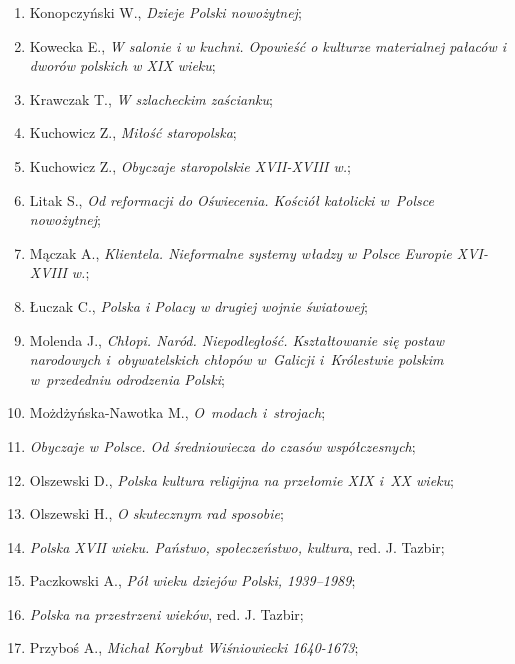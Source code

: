 \documentclass[a4paper,11pt]{article}
\begin{document}
\begin{enumerate}
\item Konopczyński W., \emph{Dzieje Polski nowożytnej};

\item Kowecka E., \emph{W salonie i w kuchni. Opowieść o kulturze
    materialnej pałaców i dworów polskich w XIX wieku};

\item Krawczak T., \emph{W szlacheckim zaścianku};

\item Kuchowicz Z., \emph{Miłość staropolska};

\item Kuchowicz Z., \emph{Obyczaje staropolskie XVII-XVIII w.};

\item Litak S., \emph{Od reformacji do Oświecenia. Kościół katolicki
    w~Polsce nowożytnej};

\item Mączak A., \emph{Klientela. Nieformalne systemy władzy w Polsce
    Europie XVI-XVIII w.};

\item Łuczak C., \emph{Polska i Polacy w drugiej wojnie światowej};

\item Molenda J., \emph{Chłopi. Naród. Niepodległość. Kształtowanie
    się postaw narodowych i~obywatelskich chłopów w~Galicji
    i~Królestwie polskim w~przededniu odrodzenia Polski};

\item Możdżyńska-Nawotka M., \emph{O~modach i~strojach};

\item \emph{Obyczaje w Polsce. Od średniowiecza do czasów
    współczesnych};

\item Olszewski D., \emph{Polska kultura religijna na przełomie XIX
    i~XX wieku};

\item Olszewski H., \emph{O skutecznym rad sposobie};

\item \emph{Polska XVII wieku. Państwo, społeczeństwo, kultura}, red.
  J. Tazbir;

\item Paczkowski A., \emph{Pół wieku dziejów Polski, 1939--1989};

\item \emph{Polska na przestrzeni wieków}, red. J. Tazbir;

\item Przyboś A., \emph{Michał Korybut Wiśniowiecki 1640-1673};


\end{enumerate}
\end{document}
